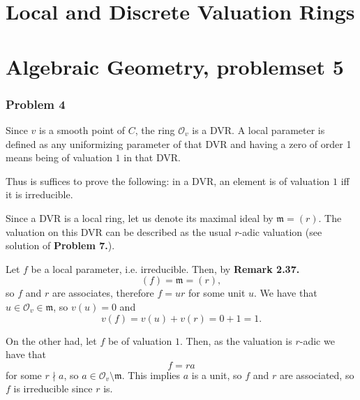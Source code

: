 \chapter{Local and Discrete Valuation Rings}





\chapter{Algebraic Geometry, problemset 5}

\subsection*{Problem 4}

Since \( v \) is a smooth point of \( C \), the ring \( \mathcal{O}_v \)
is a DVR. A local parameter is defined as any uniformizing parameter
of that DVR and having a zero of order 1 means being of valuation \( 1 \)
in that DVR.

Thus is suffices to prove the following: in a DVR, an element is of valuation
\( 1 \) iff it is irreducible.

Since a DVR is a local ring, let us denote its maximal ideal by \( \mathfrak{m} = (r) \).
The valuation on this DVR can be described as the usual \( r \)-adic valuation
(see solution of {\bf Problem 7.}).

Let \( f \) be a local parameter, i.e. irreducible. Then, by {\bf Remark 2.37.}
\[ 
    (f) = \mathfrak{m} = (r), 
\]
so \( f \) and \( r \) are associates, therefore \( f = ur \) for some unit \( u \).
We have that \( u \in \mathcal{O}_v \in \mathfrak{m} \), so \( v(u) = 0 \) and
\[ 
    v(f) = v(u) + v(r) = 0 + 1 = 1. 
\]

On the other had, let \( f \) be of valuation \( 1 \). Then, as the valuation
is \( r \)-adic we have that
\[ 
    f = ra 
\]
for some \( r \nmid a \), so \( a \in \mathcal{O}_v \setminus \mathfrak{m} \).
This implies \( a \) is a unit, so \( f \) and \( r \) are associated,
so \( f \) is irreducible since \( r \) is.


